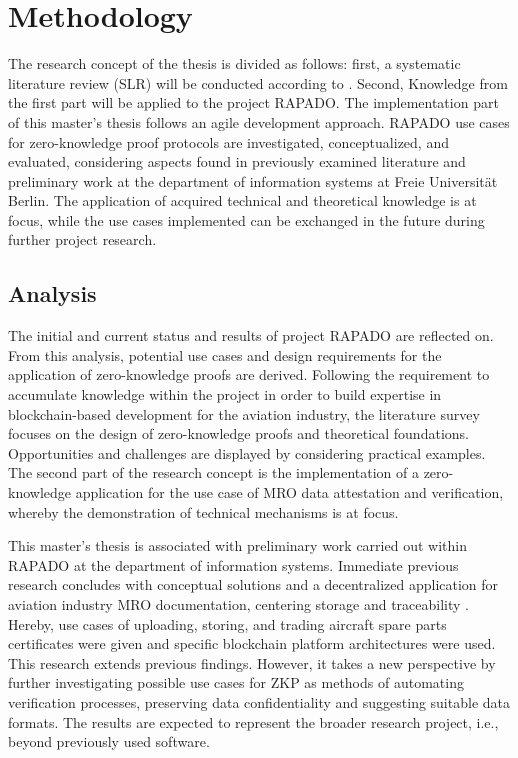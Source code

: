\chapter{Methodology}
The research concept of the thesis is divided as follows: first, a systematic literature review (SLR) will be conducted according to \cite{HevnerAR2004DSiI, vomBrockeJan2019TDgs, Webster2002AnalyzingTP}. Second, Knowledge from the first part will be applied to the project RAPADO. The implementation part of this master's thesis follows an agile development approach. RAPADO use cases for zero-knowledge proof protocols are investigated, conceptualized, and evaluated, considering aspects found in previously examined literature and preliminary work at the department of information systems at Freie Universit{\"a}t Berlin. The application of acquired technical and theoretical knowledge is at focus, while the use cases implemented can be exchanged in the future during further project research. 

\section{Analysis}
The initial and current status and results of project RAPADO are reflected on. From this analysis, potential use cases and design requirements for the application of zero-knowledge proofs are derived. Following the requirement to accumulate knowledge within the project in order to build expertise in blockchain-based development for the aviation industry, the literature survey focuses on the design of zero-knowledge proofs and theoretical foundations. Opportunities and challenges are displayed by considering practical examples. The second part of the research concept is the implementation of a zero-knowledge application for the use case of MRO data attestation and verification, whereby the demonstration of technical mechanisms is at focus.

This master's thesis is associated with preliminary work carried out within RAPADO at the department of information systems. Immediate previous research concludes with conceptual solutions and a decentralized application for aviation industry MRO documentation, centering storage and traceability \citep{ZedelJ, semesterproject}. Hereby, use cases of uploading, storing, and trading aircraft spare parts certificates were given and specific blockchain platform architectures were used. This research extends previous findings. However, it takes a new perspective by further investigating possible use cases for ZKP as methods of automating verification processes, preserving data confidentiality and suggesting suitable data formats. The results are expected to represent the broader research project, i.e., beyond previously used software.

